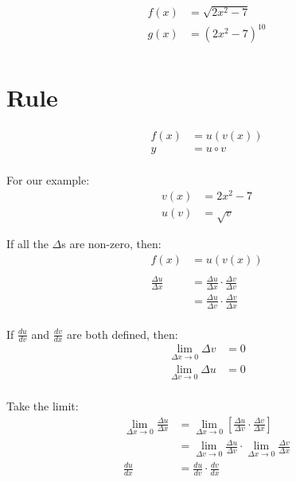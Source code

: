 \documentclass[letterpaper, landscape]{exam}
\begin{document}
  \begin{align*}
    f(x) & = \sqrt{2x^2 - 7} \\
    g(x) & = \left( 2x^2 - 7 \right)^{10} \\
  \end{align*}

  \section{Rule} %
  
  \begin{align*}
    f(x) & = u(v(x)) \\
    y    & = u \circ v \\
  \end{align*}

  For our example:
  \begin{align*}
    v(x) & = 2x^2 - 7 \\
    u(v) & = \sqrt{v}
  \end{align*}

  If all the $\Delta$s are non-zero, then:
  \begin{align*}
    f(x) &= u(v(x)) \\
    \\
    \frac{\Delta u}{\Delta x} & = \frac{\Delta u}{\Delta x} \cdot \frac{\Delta v}{\Delta v} \\
                              & = \frac{\Delta u}{\Delta v} \cdot \frac{\Delta v}{\Delta x} \\
  \end{align*}

  If $\frac{du}{dv}$ and $\frac{dv}{dx}$ are both defined, then:
  \begin{align*}
    \lim_{\Delta x \to 0} \Delta v &= 0 \\
    \lim_{\Delta v \to 0} \Delta u &= 0 \\
  \end{align*}

  Take the limit:
  \begin{align*}
    \lim_{\Delta x \to 0} \frac{\Delta u}{\Delta x} 
                  & = \lim_{\Delta x \to 0} \left[ \frac{\Delta u}{\Delta v} \cdot \frac{\Delta v}{\Delta x} \right] \\
                  & = \lim_{\Delta v \to 0} \frac{\Delta u}{\Delta v} \cdot \lim_{\Delta x \to 0} \frac{\Delta v}{\Delta x} \\
    \frac{du}{dx} & = \frac{du}{dv} \cdot \frac{dv}{dx} \\
  \end{align*}
\end{document}
